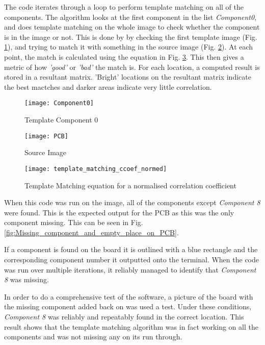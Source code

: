 \documentclass[conference]{IEEEtran}
\begin{document}
The code iterates through a loop to perform template matching on all of the components. The algorithm looks at the first component in the list \textit{Component0}, and does template matching on the whole image to check whether the component is in the image or not. This is done by by checking the first template image (Fig. \ref{fig:Component0}), and trying to match it with something in the source image (Fig. \ref{fig:PCB}). At each point, the match is calculated using the equation in Fig. \ref{fig:template_matching_ccoef_normed}. This then gives a metric of how \textit{'good'} or \textit{'bad'} the match is. For each location, a computed result is stored in a resultant matrix. 'Bright' locations on the resultant matrix indicate the best mactches and darker areas indicate very little correlation. \cite{ref:open_cv_templae_matching}

\begin{figure}[h]
\centerline{\texttt{[image: Component0]}}
\caption{Template Component 0}
\label{fig:Component0}
\end{figure}

\begin{figure}[h]
\centerline{\texttt{[image: PCB]}}
\caption{Source Image }
\label{fig:PCB}
\end{figure}

\begin{figure}[H]
\centerline{\texttt{[image: template\_matching\_ccoef\_normed]}}
\caption{Template Matching equation for a normalised correlation coefficient}
\label{fig:template_matching_ccoef_normed}
\end{figure}

When this code was run on the image, all of the components except \textit{Component 8} were found. This is the expected output for the PCB as this was the only component missing. This can be seen in Fig. \ref{fig:Missing_component_and_empty_place_on_PCB}.

If a component is found on the board it is outlined with a blue rectangle and the corresponding component number it outputted onto the terminal. When the code was run over multiple iterations, it reliably managed to identify that \textit{Component 8} was missing. 

In order to do a comprehensive test of the software, a picture of the board with the missing component added back on was used a test. Under these conditions, \textit{Component 8} was reliably and repeatably found in the correct location. This result shows that the template matching algorithm was in fact working on all the components and was not missing any on its run through. 
\end{document}
